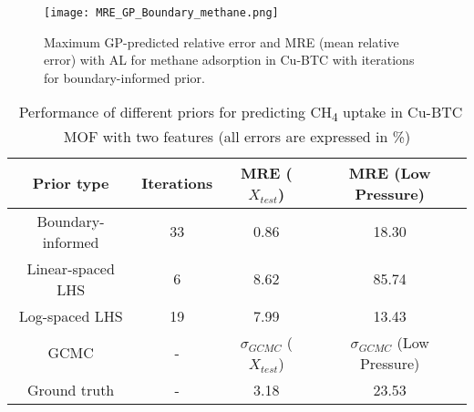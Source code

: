 \documentclass[twoside,twocolumn,9pt]{article}
\begin{document}
\begin{figure}[ht]
\centering
  \texttt{[image: MRE\_GP\_Boundary\_methane.png]}
  \caption{Maximum GP-predicted relative error and MRE (mean relative error) with AL for methane adsorption in Cu-BTC with iterations for boundary-informed prior.}
  \label{fgr:boundary-rel-rrmse-methane}
\end{figure}

\begin{table}[ht]
\small
  \caption{\ Performance of different priors for predicting CH\textsubscript{4} uptake in Cu-BTC MOF with two features (all errors are expressed in \%)} 
  \label{tbl:CH4_2f}
  \begin{tabular*}{0.48\textwidth}{@{\extracolsep{\fill}}cccc}
    \hline
   Prior type & Iterations & MRE ($X_{test}$) & MRE (Low Pressure)\\
    \hline
    Boundary-informed & 33 & 0.86 & 18.30\\
    Linear-spaced LHS & 6 & 8.62 & 85.74\\
    Log-spaced LHS & 19 & 7.99 & 13.43\\
    \hline
    GCMC & - & $\sigma_{GCMC}$ ($X_{test}$) & $\sigma_{GCMC}$ (Low Pressure)\\ 
    \hline
    Ground truth & - & 3.18 & 23.53\\
    \hline
  \end{tabular*}
\end{table}

 
\end{document}
